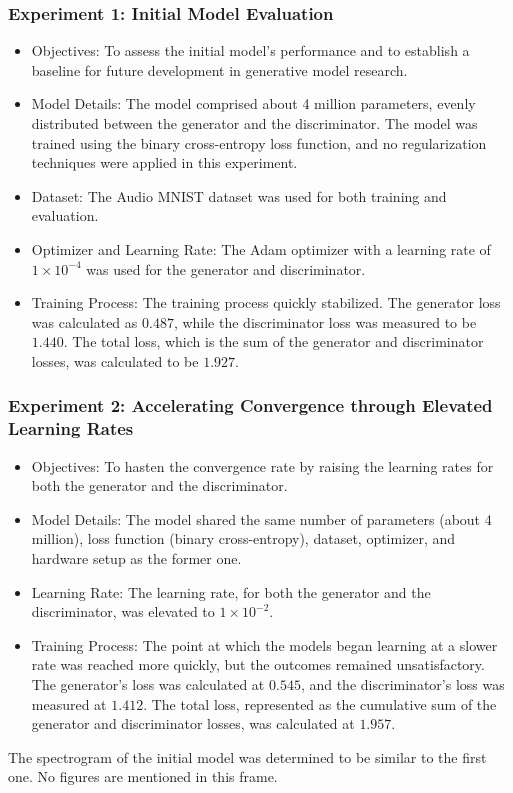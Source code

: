 \begin{frame}
    \frametitle{Experiment 1: Initial Model Evaluation}

    \begin{itemize}
        \item Objectives: To assess the initial model's performance and to establish a baseline for future development in generative model research.
        \item Model Details: The model comprised about 4 million parameters, evenly distributed between the generator and the discriminator. The model was trained using the binary cross-entropy loss function, and no regularization techniques were applied in this experiment.
        \item Dataset: The Audio MNIST dataset was used for both training and evaluation.
        \item Optimizer and Learning Rate: The Adam optimizer with a learning rate of $1 \times 10^{-4}$ was used for the generator and discriminator.
        \item Training Process: The training process quickly stabilized. The generator loss was calculated as $0.487$, while the discriminator loss was measured to be $1.440$. The total loss, which is the sum of the generator and discriminator losses, was calculated to be $1.927$.
    \end{itemize}

\end{frame}

\begin{frame}
    \frametitle{Experiment 2: Accelerating Convergence through Elevated Learning Rates}

    \begin{itemize}
        \item Objectives: To hasten the convergence rate by raising the learning rates for both the generator and the discriminator.
        \item Model Details: The model shared the same number of parameters (about 4 million), loss function (binary cross-entropy), dataset, optimizer, and hardware setup as the former one.
        \item Learning Rate: The learning rate, for both the generator and the discriminator, was elevated to $1 \times 10^{-2}$.
        \item Training Process: The point at which the models began learning at a slower rate was reached more quickly, but the outcomes remained unsatisfactory. The generator’s loss was calculated at $0.545$, and the discriminator’s loss was measured at $1.412$. The total loss, represented as the cumulative sum of the generator and discriminator losses, was calculated at $1.957$.
    \end{itemize}

    The spectrogram of the initial model was determined to be similar to the first one. No figures are mentioned in this frame.

\end{frame}

